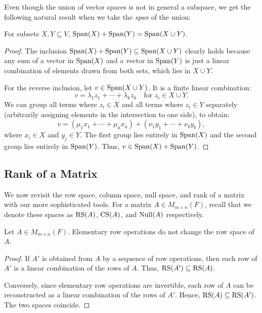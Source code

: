 \documentclass[../linear_algebra_and_groups.tex]{subfiles}
\begin{document}
Even though the union of vector spaces is not in general a subspace, we get the following natural result when we take the \textit{span} of the union:
\begin{lemma}
    \begin{shaded*}
        For subsets $X,Y\subseteq V$, $\operatorname{Span}(X)+\operatorname{Span}(Y)=\operatorname{Span}(X\cup Y)$.
    \end{shaded*}
\end{lemma}
\begin{proof}
    The inclusion $\operatorname{Span}(X)+\operatorname{Span}(Y) \subseteq \operatorname{Span}(X\cup Y)$ clearly holds because any sum of a vector in $\operatorname{Span}(X)$ and a vector in $\operatorname{Span}(Y)$ is just a linear combination of elements drawn from both sets, which lies in $X\cup Y$. 
    
    For the reverse inclusion, let $v\in\operatorname{Span}(X\cup Y)$. It is a finite linear combination:
    \[ v = \lambda_1z_1+\cdots+\lambda_kz_k \quad \text{for } z_i\in X\cup Y. \]
    We can group all terms where $z_i \in X$ and all terms where $z_i \in Y$ separately (arbitrarily assigning elements in the intersection to one side), to obtain:
    \[ v = (\mu_1x_1+\cdots+\mu_ax_a) + (\nu_1y_1+\cdots+\nu_by_b), \]
    where $x_i \in X$ and $y_j \in Y$. The first group lies entirely in $\operatorname{Span}(X)$ and the second group lies entirely in $\operatorname{Span}(Y)$. Thus, $v \in \operatorname{Span}(X)+\operatorname{Span}(Y)$.\qedhere
\end{proof}


\subsection{Rank of a Matrix}

We now revisit the row space, column space, null space, and rank of a matrix with our more sophisticated tools. For a matrix $A\in M_{m\times n}(F)$, recall that we denote these spaces as $\operatorname{RS}(A)$, $\operatorname{CS}(A)$, and $\operatorname{Null}(A)$ respectively.

\begin{proposition}
    \begin{shaded*}
        Let $A\in M_{m\times n}(F)$. Elementary row operations do not change the row space of $A$.
    \end{shaded*}
\end{proposition}
\begin{proof}
    If $A'$ is obtained from $A$ by a sequence of row operations, then each row of $A'$ is a linear combination of the rows of $A$. Thus, $\operatorname{RS}(A') \subseteq \operatorname{RS}(A)$. 
    
    Conversely, since elementary row operations are invertible, each row of $A$ can be reconstructed as a linear combination of the rows of $A'$. Hence, $\operatorname{RS}(A) \subseteq \operatorname{RS}(A')$. The two spaces coincide.\qedhere
\end{proof}
\end{document}
